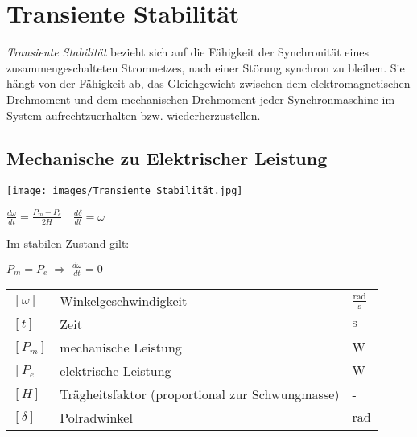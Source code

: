 \section{Transiente Stabilität}
\textit{Transiente Stabilität} bezieht sich auf die Fähigkeit der Synchronität eines zusammengeschalteten Stromnetzes, nach einer Störung synchron zu bleiben. Sie hängt von der Fähigkeit ab, das Gleichgewicht zwischen dem elektromagnetischen Drehmoment und dem mechanischen Drehmoment jeder Synchronmaschine im System aufrechtzuerhalten bzw. wiederherzustellen.


\subsection{Mechanische zu Elektrischer Leistung}

\texttt{[image: images/Transiente\_Stabilität.jpg]}

\vspace{0.15cm}

$
\boxed{
\frac{d\omega}{dt} = \frac{P_m - P_e}{2H}
}
\quad
\boxed{
\frac{d\delta}{dt} = \omega
}
$

\vspace{0.15cm}

Im stabilen Zustand gilt: 

\vspace{0.15cm}


$P_m = P_e \; \Rightarrow \; \frac{d\omega}{dt} = 0$

\vspace{0.15cm}

\renewcommand{\arraystretch}{1.2}
\begin{tabular}{@{} l p{6cm} l @{}}
    $[\omega]$     & Winkelgeschwindigkeit \dotfill              & $\frac{\text{rad}}{\text{s}}$ \\
    $[t]$          & Zeit \dotfill                               & $\text{s}$ \\
    $[P_m]$        & mechanische Leistung \dotfill               & $\text{W}$ \\
    $[P_e]$        & elektrische Leistung \dotfill               & $\text{W}$ \\
    $[H]$          & Trägheitsfaktor (proportional zur Schwungmasse) \dotfill & - \\
    $[\delta]$     & Polradwinkel \dotfill                        & $\text{rad}$ \\
\end{tabular}

